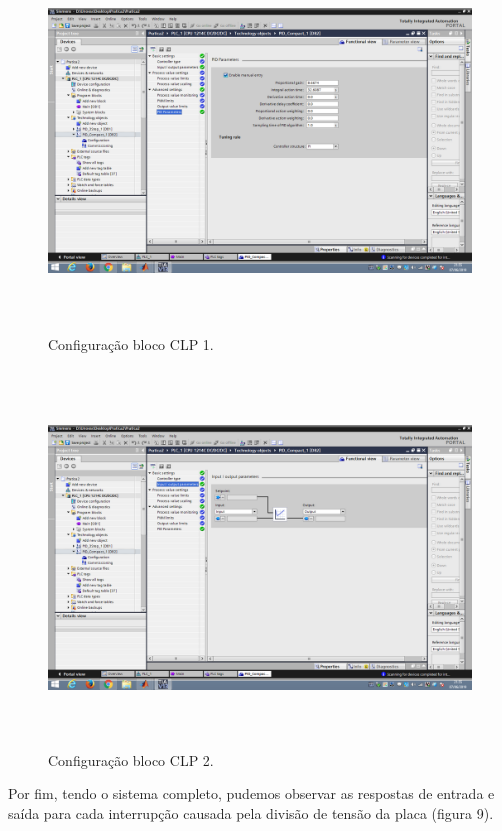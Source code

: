 \documentclass[12pt,a4paper]{article}
\begin{document}
\begin{figure}[H]
	\centering
	\caption{Configuração bloco CLP 1.}
	\label{fig:7}	
	\includegraphics[height=10cm]{figuras/config_bloco_clp.png} %
\end{figure}

\begin{figure}[H]
	\centering
	\caption{Configuração bloco CLP 2.}
	\label{fig:8}	
	\includegraphics[height=10cm]{figuras/config_bloco_clp_2.png} %
\end{figure}

Por fim, tendo o sistema completo, pudemos observar as respostas de entrada e saída para cada interrupção causada pela divisão de tensão da placa (figura 9).
\end{document}
